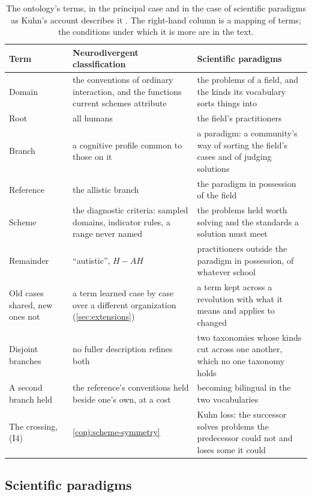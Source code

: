 \begin{table}[t]
\centering
\small
\caption{The ontology's terms, in the principal case and in the case of scientific paradigms as Kuhn's account describes it \cite{Kuhn1962, OberheimHoyningenHuene2024}. The right-hand column is a mapping of terms; the conditions under which it is more are in the text.}
\label{tab:instances}
\begin{tabular}{@{}p{3.1cm}p{5.0cm}p{5.6cm}@{}}
\toprule
Term & Neurodivergent classification & Scientific paradigms \\
\midrule
Domain & the conventions of ordinary interaction, and the functions current schemes attribute & the problems of a field, and the kinds its vocabulary sorts things into \\
\addlinespace
Root & all humans & the field's practitioners \\
\addlinespace
Branch & a cognitive profile common to those on it & a paradigm: a community's way of sorting the field's cases and of judging solutions \\
\addlinespace
Reference & the allistic branch & the paradigm in possession of the field \\
\addlinespace
Scheme & the diagnostic criteria: sampled domains, indicator rules, a range never named & the problems held worth solving and the standards a solution must meet \\
\addlinespace
Remainder & ``autistic'', $H - AH$ & practitioners outside the paradigm in possession, of whatever school \\
\addlinespace
Old cases shared, new ones not & a term learned case by case over a different organization (\autoref{sec:extensions}) & a term kept across a revolution with what it means and applies to changed \\
\addlinespace
Disjoint branches & no fuller description refines both & two taxonomies whose kinds cut across one another, which no one taxonomy holds \\
\addlinespace
A second branch held & the reference's conventions held beside one's own, at a cost & becoming bilingual in the two vocabularies \\
\addlinespace
The crossing, (I4) & \autoref{conj:scheme-symmetry} & Kuhn loss: the successor solves problems the predecessor could not and loses some it could \\
\bottomrule
\end{tabular}
\end{table}

\subsection{Scientific paradigms}
\label{sec:paradigms}

